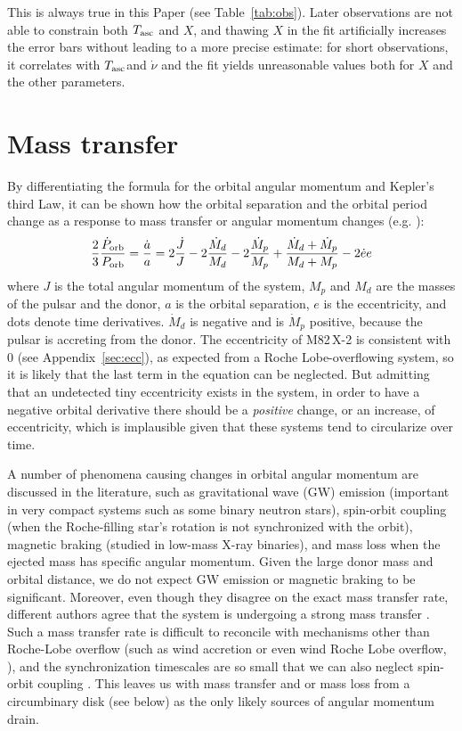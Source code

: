 \documentclass[twocolumn]{aastex631}
\newcommand{\Mtwo}{M82\,X-2\xspace}
\newcommand{\nudot}{\ensuremath{\dot{\nu}}}
\newcommand{\Porbdot}{\ensuremath{\dot{P}_{\rm orb}}}
\newcommand{\Porb}{\ensuremath{P_{\rm orb}}}
\newcommand{\Mdot}{\ensuremath{\dot{M}}}
\newcommand{\tasc}{\ensuremath{T_{\rm asc}{}}}
\newcommand{\tabref}{Table~\ref}
\begin{document}
This is always true in this Paper (see \tabref{tab:obs}).
Later observations are not able to constrain both $\tasc$ and $X$, and thawing $X$ in the fit artificially increases the error bars without leading to a more precise estimate: for short observations, it correlates with \tasc and $\nudot$ and the fit yields unreasonable values both for $X$ and the other parameters.

\section{Mass transfer}\label{sec:transfer}
By differentiating the formula for the orbital angular momentum and Kepler's third Law, it can be shown how the orbital separation and the orbital period change as a response to mass transfer or angular momentum changes (e.g. \citealt{taurisFormationEvolutionCompact2006}):
\begin{equation}\label{eq:pdotvsmdot}
    \frac{2}{3} \frac{\Porbdot}{\Porb} = \frac{\dot{a}}{a} = 2\frac{\dot{J}}{J} -2\frac{\Mdot_d}{M_d} -2\frac{\Mdot_p}{M_p} + \frac{\Mdot_d + \Mdot_p}{M_d + M_p} -2\dot{e}e
\end{equation}
where $J$ is the total angular momentum of the system, $M_{p}$ and $M_d$ are the masses of the pulsar and the donor, $a$ is the orbital separation, $e$ is the eccentricity, and dots denote time derivatives.
$\Mdot_d$ is negative and is $\Mdot_p$ positive, because the pulsar is accreting from the donor.
The eccentricity of \Mtwo is consistent with 0 (see Appendix~\ref{sec:ecc}), as expected from a Roche Lobe-overflowing system, so it is likely that the last term in the equation can be neglected.
But admitting that an undetected tiny eccentricity exists in the system, in order to have a negative orbital derivative there should be a \textit{positive} change, or an increase, of eccentricity, which is implausible given that these systems tend to circularize over time.

A number of phenomena causing changes in orbital angular momentum are discussed in the literature, such as gravitational wave (GW) emission (important in very compact systems such as some binary neutron stars), spin-orbit coupling (when the Roche-filling star's rotation is not synchronized with the orbit), magnetic braking (studied in low-mass X-ray binaries), and mass loss when the ejected mass has specific angular momentum.
Given the large donor mass and orbital distance, we do not expect GW emission or magnetic braking to be significant.
Moreover, even though they disagree on the exact mass transfer rate, different authors agree that the system is undergoing a strong mass transfer \citep{kingPulsingNonpulsingULXs2020,mushtukovOpticallyThickEnvelopes2017}.
Such a mass transfer rate is difficult to reconcile with mechanisms other than Roche-Lobe overflow (such as wind accretion or even wind Roche Lobe overflow, \citealt{mellahWindRocheLobe2019}), and the synchronization timescales are so small that we can also neglect spin-orbit coupling \citep{2009AN....330..727S,2001nsbh.conf..337T}.
This leaves us with mass transfer and or mass loss from a circumbinary disk (see below) as the only likely sources of angular momentum drain.
\end{document}
